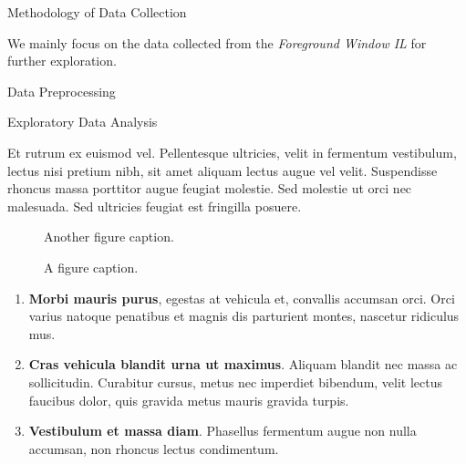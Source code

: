 \documentclass[final]{beamer}
\newlength{\colwidth}
\begin{document}
\begin{frame}[t]
\begin{columns}[t]
\begin{column}{\colwidth}
\begin{alertblock}{Methodology of Data Collection}
\begin{itemize}
    \end{itemize}

    We mainly focus on the data collected from the \textit{Foreground Window IL} for further exploration.

  \end{alertblock}

  \begin{block}{Data Preprocessing}
  \end{block}
\begin{block}{Exploratory Data Analysis}

    Et rutrum ex euismod vel. Pellentesque ultricies, velit in fermentum
    vestibulum, lectus nisi pretium nibh, sit amet aliquam lectus augue vel
    velit. Suspendisse rhoncus massa porttitor augue feugiat molestie. Sed
    molestie ut orci nec malesuada. Sed ultricies feugiat est fringilla
    posuere.

    \begin{figure}
      \centering
      \caption{Another figure caption.}
    \end{figure}
    \begin{figure}
      \centering
      \caption{A figure caption.}
    \end{figure}
    \begin{enumerate}
      \item \textbf{Morbi mauris purus}, egestas at vehicula et, convallis
        accumsan orci. Orci varius natoque penatibus et magnis dis parturient
        montes, nascetur ridiculus mus.
      \item \textbf{Cras vehicula blandit urna ut maximus}. Aliquam blandit nec
        massa ac sollicitudin. Curabitur cursus, metus nec imperdiet bibendum,
        velit lectus faucibus dolor, quis gravida metus mauris gravida turpis.
      \item \textbf{Vestibulum et massa diam}. Phasellus fermentum augue non
        nulla accumsan, non rhoncus lectus condimentum.
    \end{enumerate}


\end{block}
\end{column}
\end{columns}
\end{frame}
\end{document}
